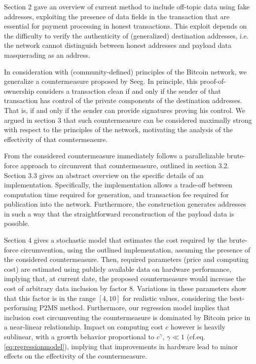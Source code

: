 \documentclass[a4paper,11pt,titlepage]{scrbook}
\begin{document}
Section 2 gave an overview of current method to include off-topic data using fake addresses, exploiting the presence of data fields in the transaction that are essential for payment processing in honest transactions.
This exploit depends on the difficulty to verify the authenticity of (generalized) destination addresses, i.e. the network cannot distinguish between honest addresses and payload data masquerading as an address.

In consideration with (community-defined) principles of the Bitcoin network, we generalize a countermeasure proposed by Seeg.
In principle, this proof-of-ownership considers a transaction clean if and only if the sender of that transaction has control of the private components of the destination addresses.
That is, if and only if the sender can provide signatures proving his control.
We argued in section 3 that such countermeasure can be considered maximally strong with respect to the principles of the network, motivating the analysis of the effectivity of that countermeasure.

From the considered countermeasure immediately follows a parallelizable brute-force approach to circumvent that countermeasure, outlined in section 3.2. Section 3.3 gives an abstract overview on the specific details of an implementation.
Specifically, the implementation allows a trade-off between computation time required for generation, and transaction fee required for publication into the network.
Furthermore, the construction generates addresses in such a way that the straightforward reconstruction of the payload data is possible.

Section 4 gives a stochastic model that estimates the cost required by the brute-force circumvention, using the outlined implementation, assuming the presence of the considered countermeasure.
Then, required parameters (price and computing cost) are estimated using publicly available data on hardware performance, implying that, at current date, the proposed countermeasure would increase the cost of arbitrary data inclusion by factor 8.
Variations in these parameters show that this factor is in the range $[4, 10]$ for realistic values, considering the best-performing P2MS method.
Furthermore, our regression model implies that inclusion cost circumventing the countermeasure is dominated by Bitcoin price in a near-linear relationship.
Impact on computing cost $c$ however is heavily sublinear, with a growth behavior proportional to $c^\gamma$, $\gamma \ll 1$ (cf.\@ eq.\@ \ref{eq:regressionmodel}), implying that improvements in hardware lead to minor effects on the effectivity of the countermeasure.
\end{document}
